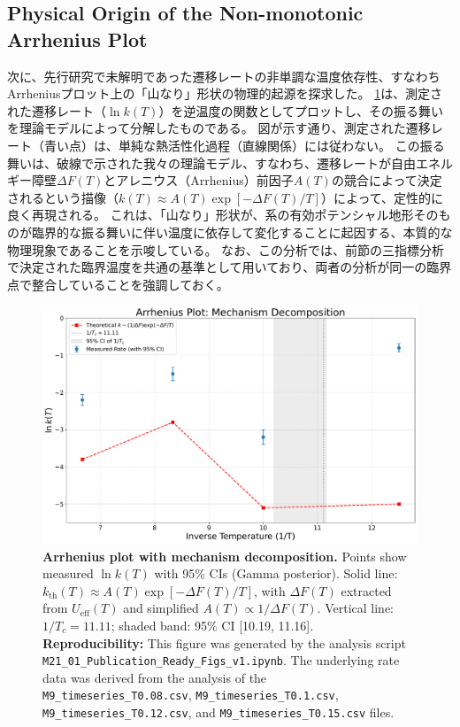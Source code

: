 \documentclass[a4paper,11pt,ja=standard,lualatex]{bxjsarticle}
\newcommand{\figref}[1]{\cref{#1}}
\begin{document}
\subsection{Physical Origin of the Non-monotonic Arrhenius Plot}
\label{subsec:arrhenius_origin}
次に、先行研究で未解明であった遷移レートの非単調な温度依存性、すなわちArrheniusプロット上の「山なり」形状の物理的起源を探求した。
\figref{fig:arrhenius}は、測定された遷移レート（$\ln k(T)$）を逆温度の関数としてプロットし、その振る舞いを理論モデルによって分解したものである。
図が示す通り、測定された遷移レート（青い点）は、単純な熱活性化過程（直線関係）には従わない。
この振る舞いは、破線で示された我々の理論モデル、すなわち、遷移レートが自由エネルギー障壁$\Delta F(T)$とアレニウス（Arrhenius）前因子$A(T)$の競合によって決定されるという描像（$k(T) \approx A(T) \exp[-\Delta F(T)/T]$）によって、定性的に良く再現される。
これは、「山なり」形状が、系の有効ポテンシャル地形そのものが臨界的な振る舞いに伴い温度に依存して変化することに起因する、本質的な物理現象であることを示唆している。
なお、この分析では、前節の三指標分析で決定された臨界温度を共通の基準として用いており、両者の分析が同一の臨界点で整合していることを強調しておく。

\begin{figure}[H]
    \centering
    \includegraphics[width=0.9\linewidth]{figures/fig2_arrhenius.pdf}
    \caption{
        \textbf{Arrhenius plot with mechanism decomposition.} 
        Points show measured $\ln k(T)$ with 95\% CIs (Gamma posterior). 
        Solid line: $k_{\mathrm{th}}(T) \approx A(T) \exp[-\Delta F(T)/T]$, with $\Delta F(T)$ extracted from $U_{\mathrm{eff}}(T)$ and simplified $A(T) \propto 1/\Delta F(T)$. 
        Vertical line: $1/T_c = 11.11$; shaded band: 95\% CI [10.19, 11.16].
        \newline\newline
        \textbf{Reproducibility:} This figure was generated by the analysis script \texttt{M21\_01\_Publication\_Ready\_Figs\_v1.ipynb}. The underlying rate data was derived from the analysis of the \texttt{M9\_timeseries\_T0.08.csv}, \texttt{M9\_timeseries\_T0.1.csv}, \texttt{M9\_timeseries\_T0.12.csv}, and \texttt{M9\_timeseries\_T0.15.csv} files.
    }
    \label{fig:arrhenius}
\end{figure}
\end{document}
